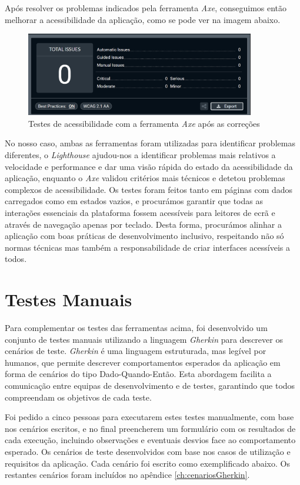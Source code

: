Após resolver os problemas indicados pela ferramenta \textit{Axe}, conseguimos então melhorar a acessibilidade da aplicação, como se pode ver na imagem abaixo.

\begin{figure}[H]
\centering
\includegraphics[max width=10cm]{./img/axe_after}
\caption{Testes de acessibilidade com a ferramenta \textit{Axe} após as correções}
\end{figure}

No nosso caso, ambas as ferramentas foram utilizadas para identificar problemas diferentes, o \textit{Lighthouse} ajudou-nos a identificar problemas mais relativos a velocidade e performance e dar uma visão rápida do estado da acessibilidade da aplicação, enquanto o \textit{Axe} validou critérios mais técnicos e detetou problemas complexos de acessibilidade. Os testes foram feitos tanto em páginas com dados carregados como em estados vazios, e procurámos garantir que todas as interações essenciais da plataforma fossem acessíveis para leitores de ecrã e através de navegação apenas por teclado. Desta forma, procurámos alinhar a aplicação com boas práticas de desenvolvimento inclusivo, respeitando não só normas técnicas mas também a responsabilidade de criar interfaces acessíveis a todos.

\section{Testes Manuais}

Para complementar os testes das ferramentas acima, foi desenvolvido um conjunto de testes manuais utilizando a linguagem \textit{Gherkin} para descrever os cenários de teste. \textit{Gherkin} é uma linguagem estruturada, mas legível por humanos, que permite descrever comportamentos esperados da aplicação em forma de cenários do tipo Dado-Quando-Então. Esta abordagem facilita a comunicação entre equipas de desenvolvimento e de testes, garantindo que todos compreendam os objetivos de cada teste.

Foi pedido a cinco pessoas para executarem estes testes manualmente, com base nos cenários escritos, e no final preencherem um formulário com os resultados de cada execução, incluindo observações e eventuais desvios face ao comportamento esperado. Os cenários de teste desenvolvidos com base nos casos de utilização e requisitos da aplicação. Cada cenário foi escrito como exemplificado abaixo. Os restantes cenários foram incluídos no apêndice \ref{ch:cenariosGherkin}.

